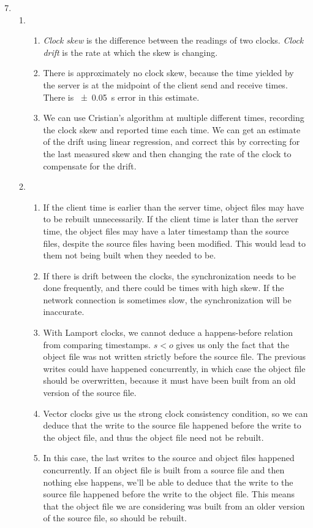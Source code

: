\documentclass{article}
\begin{document}
\begin{enumerate}
    \setcounter{enumi}{6}
  \item
    \begin{enumerate}
      \item
        \begin{enumerate}
          \item \textit{Clock skew} is the difference between the readings of two clocks. \textit{Clock drift} is the rate at which the skew is changing.
          \item There is approximately no clock skew, because the time yielded by the server is at the midpoint of the client send and receive times. There is \SI{\pm 0.05}{s} error in this estimate.
          \item We can use Cristian's algorithm at multiple different times, recording the clock skew and reported time each time. We can get an estimate of the drift using linear regression, and correct this by correcting for the last measured skew and then changing the rate of the clock to compensate for the drift.
        \end{enumerate}
      \item
        \begin{enumerate}
          \item If the client time is earlier than the server time, object files may have to be rebuilt unnecessarily. If the client time is later than the server time, the object files may have a later timestamp than the source files, despite the source files having been modified. This would lead to them not being built when they needed to be.
          \item If there is drift between the clocks, the synchronization needs to be done frequently, and there could be times with high skew. If the network connection is sometimes slow, the synchronization will be inaccurate.
          \item With Lamport clocks, we cannot deduce a happens-before relation from comparing timestamps. $s < o$ gives us only the fact that the object file was not written strictly before the source file. The previous writes could have happened concurrently, in which case the object file should be overwritten, because it must have been built from an old version of the source file.
          \item Vector clocks give us the strong clock consistency condition, so we can deduce that the write to the source file happened before the write to the object file, and thus the object file need not be rebuilt.
          \item In this case, the last writes to the source and object files happened concurrently. If an object file is built from a source file and then nothing else happens, we'll be able to deduce that the write to the source file happened before the write to the object file. This means that the object file we are considering was built from an older version of the source file, so should be rebuilt.
        \end{enumerate}
    \end{enumerate}
\end{enumerate}
\end{document}
